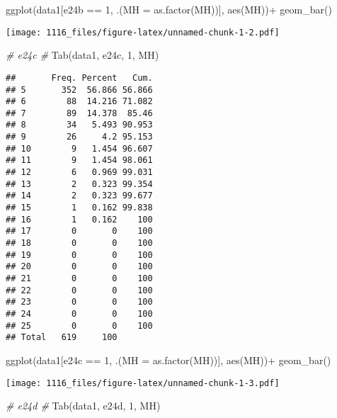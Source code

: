 \documentclass[
]{article}
\newenvironment{Shaded}{\begin{snugshade}}{\end{snugshade}}
\newcommand{\AttributeTok}[1]{\textcolor[rgb]{0.77,0.63,0.00}{#1}}
\newcommand{\CommentTok}[1]{\textcolor[rgb]{0.56,0.35,0.01}{\textit{#1}}}
\newcommand{\DecValTok}[1]{\textcolor[rgb]{0.00,0.00,0.81}{#1}}
\newcommand{\FunctionTok}[1]{\textcolor[rgb]{0.00,0.00,0.00}{#1}}
\newcommand{\NormalTok}[1]{#1}
\newcommand{\SpecialCharTok}[1]{\textcolor[rgb]{0.00,0.00,0.00}{#1}}
\newcommand{\StringTok}[1]{\textcolor[rgb]{0.31,0.60,0.02}{#1}}
\begin{document}
\begin{Shaded}
\begin{Highlighting}[]
\FunctionTok{ggplot}\NormalTok{(data1[e24b }\SpecialCharTok{==} \DecValTok{1}\NormalTok{, .(}\AttributeTok{MH =} \FunctionTok{as.factor}\NormalTok{(MH))], }\FunctionTok{aes}\NormalTok{(MH))}\SpecialCharTok{+}
    \FunctionTok{geom\_bar}\NormalTok{()}
\end{Highlighting}
\end{Shaded}

\texttt{[image: 1116\_files/figure-latex/unnamed-chunk-1-2.pdf]}

\begin{Shaded}
\begin{Highlighting}[]
\CommentTok{\# e24c \#}
\FunctionTok{Tab}\NormalTok{(data1, }\StringTok{\textquotesingle{}e24c\textquotesingle{}}\NormalTok{, }\DecValTok{1}\NormalTok{, }\StringTok{\textquotesingle{}MH\textquotesingle{}}\NormalTok{)}
\end{Highlighting}
\end{Shaded}

\begin{verbatim}
##       Freq. Percent   Cum.
## 5       352  56.866 56.866
## 6        88  14.216 71.082
## 7        89  14.378  85.46
## 8        34   5.493 90.953
## 9        26     4.2 95.153
## 10        9   1.454 96.607
## 11        9   1.454 98.061
## 12        6   0.969 99.031
## 13        2   0.323 99.354
## 14        2   0.323 99.677
## 15        1   0.162 99.838
## 16        1   0.162    100
## 17        0       0    100
## 18        0       0    100
## 19        0       0    100
## 20        0       0    100
## 21        0       0    100
## 22        0       0    100
## 23        0       0    100
## 24        0       0    100
## 25        0       0    100
## Total   619     100
\end{verbatim}

\begin{Shaded}
\begin{Highlighting}[]
\FunctionTok{ggplot}\NormalTok{(data1[e24c }\SpecialCharTok{==} \DecValTok{1}\NormalTok{, .(}\AttributeTok{MH =} \FunctionTok{as.factor}\NormalTok{(MH))], }\FunctionTok{aes}\NormalTok{(MH))}\SpecialCharTok{+}
    \FunctionTok{geom\_bar}\NormalTok{()}
\end{Highlighting}
\end{Shaded}

\texttt{[image: 1116\_files/figure-latex/unnamed-chunk-1-3.pdf]}

\begin{Shaded}
\begin{Highlighting}[]
\CommentTok{\# e24d \#}
\FunctionTok{Tab}\NormalTok{(data1, }\StringTok{\textquotesingle{}e24d\textquotesingle{}}\NormalTok{, }\DecValTok{1}\NormalTok{, }\StringTok{\textquotesingle{}MH\textquotesingle{}}\NormalTok{)}
\end{Highlighting}
\end{Shaded}
\end{document}
